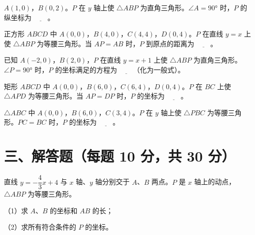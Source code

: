 \documentclass{exam-zh}
\newcommand{\answerarea}[1][40mm]{%
  \vspace{2mm}%
  \begin{tcolorbox}[
    enhanced, breakable,
    colback=white,
    colframe=white,
    boxrule=0pt,
    height=#1,
    valign=top,
    bottom=0mm,
    after skip=0mm,
  ]
  \end{tcolorbox}%
}
\begin{document}
\begin{question}[points=3]
  $A(1,0)$，$B(0,2)$。$P$ 在 $y$ 轴上使 $\triangle ABP$ 为直角三角形。$\angle A=90°$ 时，$P$ 的纵坐标为 $\underline{\quad\quad}$。
  \fillin
\end{question}



\begin{question}[points=3]
  正方形 $ABCD$ 中 $A(0,0)$，$B(4,0)$，$C(4,4)$，$D(0,4)$。$P$ 在直线 $y=x$ 上使 $\triangle ABP$ 为等腰三角形。当 $AP=AB$ 时，$P$ 到原点的距离为 $\underline{\quad\quad}$。
  \fillin
\end{question}



\begin{question}[points=3]
  已知 $A(-2,0)$，$B(2,0)$，$P$ 在直线 $y=x+1$ 上使 $\triangle ABP$ 为直角三角形。$\angle P=90°$ 时，$P$ 的坐标满足的方程为 $\underline{\quad\quad}$（化为一般式）。
  \fillin
\end{question}



\begin{question}[points=3]
  矩形 $ABCD$ 中 $A(0,0)$，$B(6,0)$，$C(6,4)$，$D(0,4)$。$P$ 在 $BC$ 上使 $\triangle APD$ 为等腰三角形。当 $AP=DP$ 时，$P$ 的坐标为 $\underline{\quad\quad}$。
  \fillin
\end{question}



\begin{question}[points=3]
  $\triangle ABC$ 中 $A(0,0)$，$B(6,0)$，$C(3,4)$。$P$ 在 $y$ 轴上使 $\triangle PBC$ 为等腰三角形。$PC=BC$ 时，$P$ 的坐标为 $\underline{\quad\quad}$。
  \fillin
\end{question}


\section*{三、解答题（每题 10 分，共 30 分）}


\begin{problem}[points=10]
  直线 $y=-\dfrac{4}{3}x+4$ 与 $x$ 轴、$y$ 轴分别交于 $A$、$B$ 两点。$P$ 是 $x$ 轴上的动点，$\triangle ABP$ 为等腰三角形。

（1）求 $A$、$B$ 的坐标和 $AB$ 的长；

（2）求所有符合条件的 $P$ 的坐标。
  \answerarea[80mm]
\end{problem}


\end{document}

